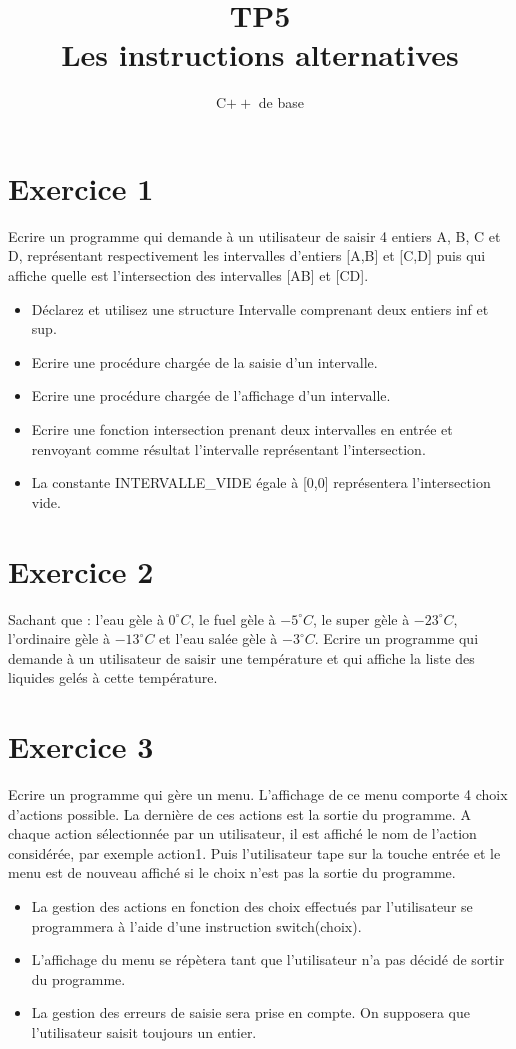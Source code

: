 \documentclass{article}
\title{TP5\\ Les instructions alternatives}
\date{C$++$ de base}
\begin{document}
	\maketitle 
	\section*{Exercice 1}
		Ecrire un programme qui demande à un utilisateur de saisir 4 entiers A, B, C et D, représentant respectivement les intervalles d'entiers [A,B] et [C,D] puis qui affiche quelle est l'intersection des intervalles [AB] et [CD].

		\begin{itemize}
			\item Déclarez et utilisez une structure Intervalle comprenant deux entiers inf et sup.
			\item Ecrire une procédure chargée de la saisie d'un intervalle.
			\item Ecrire une procédure chargée de l'affichage d'un intervalle.
			\item Ecrire une fonction intersection prenant deux intervalles en entrée et renvoyant comme résultat l'intervalle représentant l'intersection.
			\item La constante INTERVALLE\_VIDE égale à [0,0] représentera l'intersection vide.			
		\end{itemize}
	\section*{Exercice 2}
		Sachant que : l'eau gèle à $0^{\circ} C$, le fuel gèle à $-5^{\circ} C$, le super gèle à $-23^{\circ} C$, l'ordinaire gèle à $-13^{\circ} C$ et l'eau salée gèle à $-3^{\circ} C$. 
		Ecrire un programme qui demande à un utilisateur de saisir une température et qui affiche la liste des liquides gelés à cette température.
	\section*{Exercice 3}
		Ecrire un programme qui gère un menu. L'affichage de ce menu comporte 4 choix d'actions possible. La dernière de ces actions est la sortie du programme. A chaque action sélectionnée par un utilisateur, 
		il est affiché le nom de l'action considérée, par exemple action1. Puis l'utilisateur tape sur la touche entrée et le menu est de nouveau affiché si le choix n'est pas la sortie du programme.

		\begin{itemize}
			\item La gestion des actions en fonction des choix effectués par l'utilisateur se programmera à l'aide d'une instruction switch(choix).
			\item L'affichage du menu se répètera tant que l'utilisateur n'a pas décidé de sortir du programme.
			\item La gestion des erreurs de saisie sera prise en compte. On supposera que l'utilisateur saisit toujours un entier.	
		\end{itemize}		
		\newpage
\end{document}
